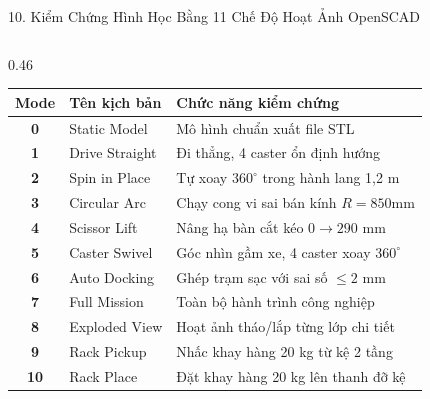 \documentclass[aspectratio=169,9pt]{beamer}
\begin{document}
\begin{frame}{10. Kiểm Chứng Hình Học Bằng 11 Chế Độ Hoạt Ảnh OpenSCAD}
\begin{columns}[T,onlytextwidth]
    \begin{column}{0.46\textwidth}
      \begin{tcolorbox}[titlepanel,title=Bảng 11 kịch bản hoạt hóa đã kiểm chứng]
        {\fontsize{6.3}{7.5}\selectfont
        \begin{tabularx}{\linewidth}{@{}clX@{}}
          \toprule
          \textbf{Mode} & \textbf{Tên kịch bản} & \textbf{Chức năng kiểm chứng} \\
          \midrule
          \textbf{0} & Static Model & Mô hình chuẩn xuất file STL \\
          \textbf{1} & Drive Straight & Đi thẳng, 4 caster ổn định hướng \\
          \textbf{2} & Spin in Place & Tự xoay $360^\circ$ trong hành lang 1,2 m \\
          \textbf{3} & Circular Arc & Chạy cong vi sai bán kính $R=850\text{mm}$ \\
          \textbf{4} & Scissor Lift & Nâng hạ bàn cắt kéo $0 \rightarrow 290\text{ mm}$ \\
          \textbf{5} & Caster Swivel & Góc nhìn gầm xe, 4 caster xoay $360^\circ$ \\
          \textbf{6} & Auto Docking & Ghép trạm sạc với sai số $\le 2\text{ mm}$ \\
          \textbf{7} & Full Mission & Toàn bộ hành trình công nghiệp \\
          \textbf{8} & Exploded View & Hoạt ảnh tháo/lắp từng lớp chi tiết \\
          \textbf{9} & Rack Pickup & Nhấc khay hàng 20 kg từ kệ 2 tầng \\
          \textbf{10} & Rack Place & Đặt khay hàng 20 kg lên thanh đỡ kệ \\
          \bottomrule
        \end{tabularx}}
      \end{tcolorbox}
    \end{column}
  \end{columns}
\end{frame}
\end{document}

